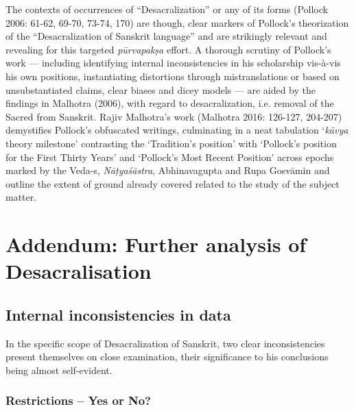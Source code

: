 The contexts of occurrences of “Desacralization” or any of its forms (Pollock 2006: 61-62, 69-70, 73-74, 170) are though, clear markers of Pollock’s theorization of the “Desacralization of Sanskrit language” and are strikingly relevant and revealing for this targeted \textit{pūrvapakṣa} effort. A thorough scrutiny of Pollock’s work — including identifying internal inconsistencies in his scholarship vis-à-vis his own positions, instantiating distortions through mistranslations or based on unsubstantiated claims, clear biases and dicey models — are aided by the findings in Malhotra (2006), with regard to desacralization, i.e. removal of the Sacred from Sanskrit. Rajiv Malhotra’s work (Malhotra 2016: 126-127, 204-207) demystifies Pollock’s obfuscated writings, culminating in a neat tabulation ‘\textit{kāvya} theory milestone’ contrasting the ‘Tradition’s position’ with ‘Pollock’s position for the First Thirty Years’ and ‘Pollock’s Most Recent Position’ across epochs marked by the Veda-s, \textit{Nāṭyaśāstra}, Abhinavagupta and Rupa Gosvāmin and outline the extent of ground already covered related to the study of the subject matter.

\section{Addendum: Further analysis of Desacralisation}

\subsection{Internal inconsistencies in data}

In the specific scope of Desacralization of Sanskrit, two clear inconsistencies present themselves on close examination, their significance to his conclusions being almost self-evident.

\vspace{-.5cm}

\subsubsection{Restrictions – Yes or No?}

\vskip -5pt

